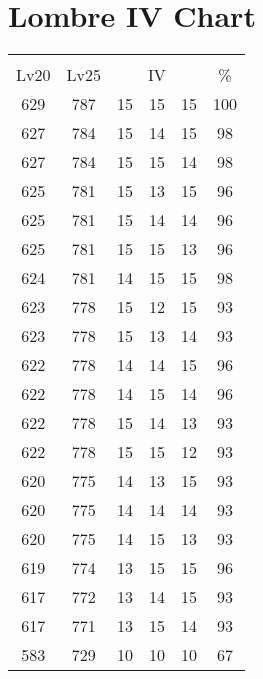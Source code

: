 \documentclass{article}%
\begin{document}
%
\normalsize%
\section{Lombre IV Chart}%
\label{sec:Lombre IV Chart}%
\renewcommand{\arraystretch}{1.5}%
\begin{tabular}{|c|c|c|c|c|c|}%
\hline%
\multicolumn{6}{|c|}{\textcolor{white}{ 
\linebreak{Lombre}
}%
\cellcolor{black}}\\%
\multicolumn{1}{|c}{Lv20}&\multicolumn{1}{c|}{Lv25}&\multicolumn{3}{c|}{IV}&\multicolumn{1}{|c|}{\%}\\%
\hline%
\rowcolor{color100}%
629&787&15&15&15&100\\%
\hline%
\rowcolor{color98}%
627&784&15&14&15&98\\%
\hline%
\rowcolor{color98}%
627&784&15&15&14&98\\%
\hline%
\rowcolor{color96}%
625&781&15&13&15&96\\%
\hline%
\rowcolor{color96}%
625&781&15&14&14&96\\%
\hline%
\rowcolor{color96}%
625&781&15&15&13&96\\%
\hline%
\rowcolor{color98}%
624&781&14&15&15&98\\%
\hline%
\rowcolor{color93}%
623&778&15&12&15&93\\%
\hline%
\rowcolor{color93}%
623&778&15&13&14&93\\%
\hline%
\rowcolor{color96}%
622&778&14&14&15&96\\%
\hline%
\rowcolor{color96}%
622&778&14&15&14&96\\%
\hline%
\rowcolor{color93}%
622&778&15&14&13&93\\%
\hline%
\rowcolor{color93}%
622&778&15&15&12&93\\%
\hline%
\rowcolor{color93}%
620&775&14&13&15&93\\%
\hline%
\rowcolor{color93}%
620&775&14&14&14&93\\%
\hline%
\rowcolor{color93}%
620&775&14&15&13&93\\%
\hline%
\rowcolor{color96}%
619&774&13&15&15&96\\%
\hline%
\rowcolor{color93}%
617&772&13&14&15&93\\%
\hline%
\rowcolor{color93}%
617&771&13&15&14&93\\%
\hline%
\rowcolor{color91}%
583&729&10&10&10&67\\%
\end{tabular}

%
\end{document}
